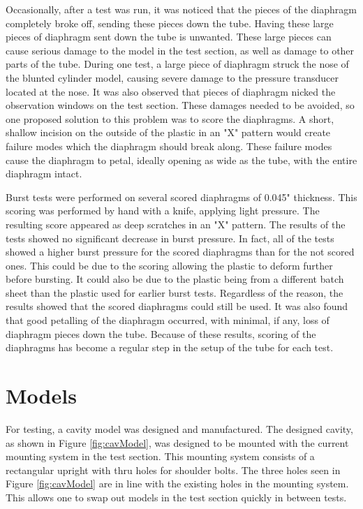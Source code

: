 Occasionally, after a test was run, it was noticed that the pieces of the diaphragm completely broke off, sending these pieces down the tube. Having these large pieces of diaphragm sent down the tube is unwanted. These large pieces can cause serious damage to the model in the test section, as well as damage to other parts of the tube. During one test, a large piece of diaphragm struck the nose of the blunted cylinder model, causing severe damage to the pressure transducer located at the nose. It was also observed that pieces of diaphragm nicked the observation windows on the test section. These damages needed to be avoided, so one proposed solution to this problem was to score the diaphragms. A short, shallow incision on the outside of the plastic in an "X" pattern would create failure modes which the diaphragm should break along. These failure modes cause the diaphragm to petal, ideally opening as wide as the tube, with the entire diaphragm intact. 

Burst tests were performed on several scored diaphragms of 0.045" thickness.  This scoring was performed by hand with a knife, applying light pressure. The resulting score appeared as deep scratches in an "X" pattern. The results of the tests showed no significant decrease in burst pressure. In fact, all of the tests showed a higher burst pressure for the scored diaphragms than for the not scored ones. This could be due to the scoring allowing the plastic to deform further before bursting. It could also be due to the plastic being from a different batch sheet than the plastic used for earlier burst tests. Regardless of the reason, the results showed that the scored diaphragms could still be used. It was also found that good petalling of the diaphragm occurred, with minimal, if any, loss of diaphragm pieces down the tube. Because of these results, scoring of the diaphragms has become a regular step in the setup of the tube for each test.  





\section{Models}

For testing, a cavity model was designed and manufactured. The designed cavity, as shown in Figure \ref{fig:cavModel}, was designed to be mounted with the current mounting system in the test section. This mounting system consists of a rectangular upright with thru holes for shoulder bolts. The three holes seen in Figure \ref{fig:cavModel} are in line with the existing holes in the mounting system. This allows one to swap out models in the test section quickly in between tests. 


